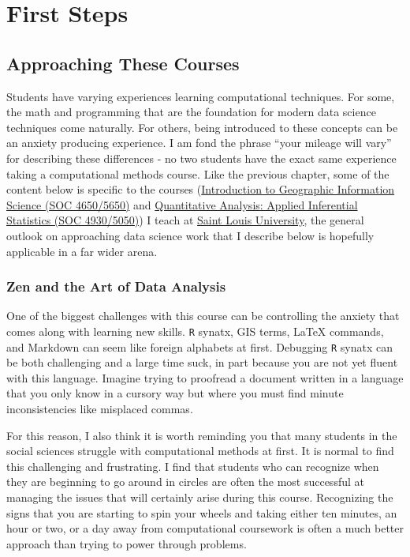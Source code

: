 \documentclass[]{book}
\theoremstyle{definition}
\theoremstyle{definition}
\theoremstyle{definition}
\theoremstyle{remark}
\begin{document}
\part{First Steps}\label{part-first-steps}

\chapter{Approaching These Courses}\label{approaching-these-courses}

Students have varying experiences learning computational techniques. For
some, the math and programming that are the foundation for modern data
science techniques come naturally. For others, being introduced to these
concepts can be an anxiety producing experience. I am fond the phrase
``your mileage will vary'' for describing these differences - no two
students have the exact same experience taking a computational methods
course. Like the previous chapter, some of the content below is specific
to the courses (\href{https://slu-soc5650.github.io}{Introduction to
Geographic Information Science (SOC 4650/5650)} and
\href{https://slu-soc5050.github.io}{Quantitative Analysis: Applied
Inferential Statistics (SOC 4930/5050)}) I teach at
\href{https://www.slu.edu}{Saint Louis University}, the general outlook
on approaching data science work that I describe below is hopefully
applicable in a far wider arena.

\hypertarget{zen-and-the-art-of-data-analysis}{\section{Zen and the Art
of Data Analysis}\label{zen-and-the-art-of-data-analysis}}

One of the biggest challenges with this course can be controlling the
anxiety that comes along with learning new skills. \texttt{R} synatx,
GIS terms, LaTeX commands, and Markdown can seem like foreign alphabets
at first. Debugging \texttt{R} synatx can be both challenging and a
large time suck, in part because you are not yet fluent with this
language. Imagine trying to proofread a document written in a language
that you only know in a cursory way but where you must find minute
inconsistencies like misplaced commas.

For this reason, I also think it is worth reminding you that many
students in the social sciences struggle with computational methods at
first. It is normal to find this challenging and frustrating. I find
that students who can recognize when they are beginning to go around in
circles are often the most successful at managing the issues that will
certainly arise during this course. Recognizing the signs that you are
starting to spin your wheels and taking either ten minutes, an hour or
two, or a day away from computational coursework is often a much better
approach than trying to power through problems.
\end{document}
